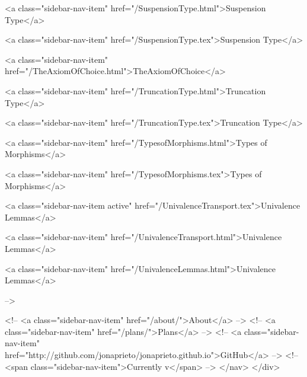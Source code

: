       
    
      
        
          <a class="sidebar-nav-item" href="/SuspensionType.html">Suspension Type</a>
        
      
    
      
        
          <a class="sidebar-nav-item" href="/SuspensionType.tex">Suspension Type</a>
        
      
    
      
        
          <a class="sidebar-nav-item" href="/TheAxiomOfChoice.html">TheAxiomOfChoice</a>
        
      
    
      
        
          <a class="sidebar-nav-item" href="/TruncationType.html">Truncation Type</a>
        
      
    
      
        
          <a class="sidebar-nav-item" href="/TruncationType.tex">Truncation Type</a>
        
      
    
      
        
          <a class="sidebar-nav-item" href="/TypesofMorphisms.html">Types of Morphisms</a>
        
      
    
      
        
          <a class="sidebar-nav-item" href="/TypesofMorphisms.tex">Types of Morphisms</a>
        
      
    
      
        
          <a class="sidebar-nav-item active" href="/UnivalenceTransport.tex">Univalence Lemmas</a>
        
      
    
      
        
          <a class="sidebar-nav-item" href="/UnivalenceTransport.html">Univalence Lemmas</a>
        
      
    
      
        
          <a class="sidebar-nav-item" href="/UnivalenceLemmas.html">Univalence Lemmas</a>
        
      
     -->

    <!-- <a class="sidebar-nav-item" href="/about/">About</a> -->
    <!-- <a class="sidebar-nav-item" href="/plans/">Plans</a> -->
    <!-- <a class="sidebar-nav-item" href="http://github.com/jonaprieto/jonaprieto.github.io">GitHub</a> -->
    <!-- <span class="sidebar-nav-item">Currently v</span> -->
  </nav>
</div>

